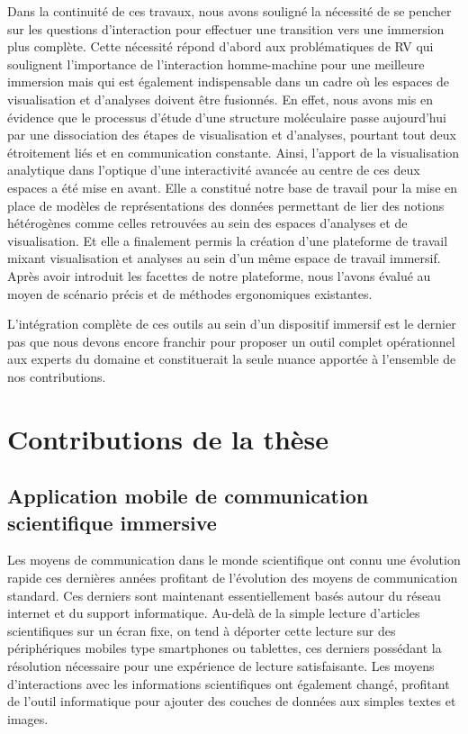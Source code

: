 Dans la continuité de ces travaux, nous avons souligné la nécessité de se pencher sur les questions d'interaction pour effectuer une transition vers une immersion plus complète. Cette nécessité répond d'abord aux problématiques de RV qui soulignent l'importance de l'interaction homme-machine pour une meilleure immersion mais qui est également indispensable dans un cadre où les espaces de visualisation et d'analyses doivent être fusionnés. En effet, nous avons mis en évidence que le processus d'étude d'une structure moléculaire passe aujourd'hui par une dissociation des étapes de visualisation et d'analyses, pourtant tout deux étroitement liés et en communication constante.
Ainsi, l'apport de la visualisation analytique dans l'optique d'une interactivité avancée au centre de ces deux espaces a été mise en avant. Elle a constitué notre base de travail pour la mise en place de modèles de représentations des données permettant de lier des notions hétérogènes comme celles retrouvées au sein des espaces d'analyses et de visualisation. Et elle a finalement permis la création d'une plateforme de travail mixant visualisation et analyses au sein d'un même espace de travail immersif. Après avoir introduit les facettes de notre plateforme, nous l'avons évalué au moyen de scénario précis et de méthodes ergonomiques existantes.

L'intégration complète de ces outils au sein d'un dispositif immersif est le dernier pas que nous devons encore franchir pour proposer un outil complet opérationnel aux experts du domaine et constituerait la seule nuance apportée à l'ensemble de nos contributions.	

\section*{Contributions de la thèse}


\subsection*{Application mobile de communication scientifique immersive}

Les moyens de communication dans le monde scientifique ont connu une évolution rapide ces dernières années profitant de l'évolution des moyens de communication standard. Ces derniers sont maintenant essentiellement basés autour du réseau internet et du support informatique. Au-delà de la simple lecture d'articles scientifiques sur un écran fixe, on tend à déporter cette lecture sur des périphériques mobiles type smartphones ou tablettes, ces derniers possédant la résolution nécessaire pour une expérience de lecture satisfaisante. Les moyens d'interactions avec les informations scientifiques ont également changé, profitant de l'outil informatique pour ajouter des couches de données aux simples textes et images.

